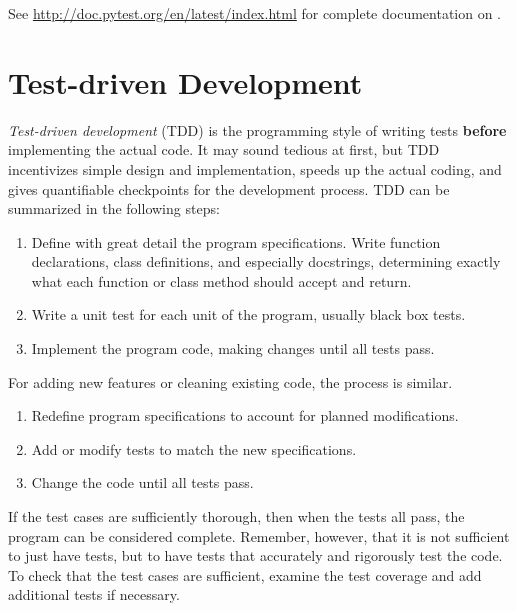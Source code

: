 See \url{http://doc.pytest.org/en/latest/index.html} for complete documentation on .

\section*{Test-driven Development} %

\emph{Test-driven development} (TDD) is the programming style of writing tests \textbf{before} implementing the actual code.
It may sound tedious at first, but TDD incentivizes simple design and implementation, speeds up the actual coding, and gives quantifiable checkpoints for the development process.
TDD can be summarized in the following steps:
\begin{enumerate}
\item Define with great detail the program specifications.
Write function declarations, class definitions, and especially docstrings, determining exactly what each function or class method should accept and return.
\item Write a unit test for each unit of the program, usually black box tests.
\item Implement the program code, making changes until all tests pass.
\end{enumerate}
For adding new features or cleaning existing code, the process is similar.
\begin{enumerate}
\item Redefine program specifications to account for planned modifications.
\item Add or modify tests to match the new specifications.
\item Change the code until all tests pass.
\end{enumerate}

\begin{center}
\end{center}

If the test cases are sufficiently thorough, then when the tests all pass, the program can be considered complete.
Remember, however, that it is not sufficient to just have tests, but to have tests that accurately and rigorously test the code.
To check that the test cases are sufficient, examine the test coverage and add additional tests if necessary.

